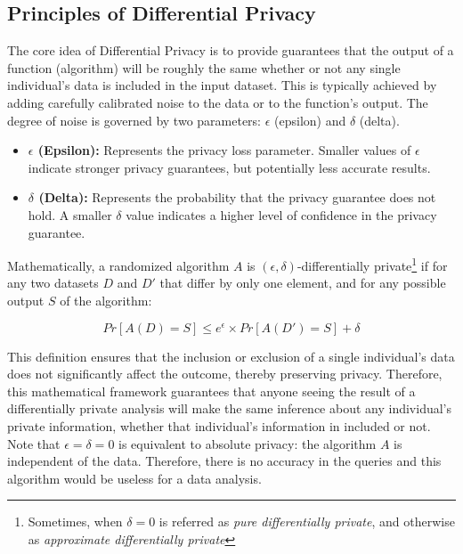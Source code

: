 \subsection{Principles of Differential Privacy}

The core idea of Differential Privacy is to provide guarantees that the output of a function (algorithm) will be roughly the same whether or not any single individual's data is included in the input dataset. This is typically achieved by adding carefully calibrated noise to the data or to the function's output. The degree of noise is governed by two parameters: $\epsilon$ (epsilon) and $\delta$ (delta).

\begin{itemize}
    \item \textbf{$\epsilon$ (Epsilon):} Represents the privacy loss parameter. Smaller values of $\epsilon$ indicate stronger privacy guarantees, but potentially less accurate results.
    \item \textbf{$\delta$ (Delta):} Represents the probability that the privacy guarantee does not hold. A smaller $\delta$ value indicates a higher level of confidence in the privacy guarantee.
\end{itemize}

Mathematically, a randomized algorithm $A$ is $(\epsilon, \delta)$-differentially private\footnote{Sometimes, when $\delta=0$ is referred as \textit{pure differentially private}, and otherwise as \textit{approximate differentially private} } if for any two datasets $D$ and $D'$ that differ by only one element, and for any possible output $S$ of the algorithm:

\[ Pr[A(D) = S] \leq e^\epsilon \times Pr[A(D') = S] + \delta \]

This definition ensures that the inclusion or exclusion of a single individual’s data does not significantly affect the outcome, thereby preserving privacy. Therefore, this mathematical framework guarantees that anyone seeing the result of a differentially private analysis will make the same inference about any individual's private information, whether that individual's information in included or not. \cite{wood2018}
Note that $\epsilon=\delta=0$ is equivalent to absolute privacy: the algorithm $A$ is independent of the data. Therefore, there is no accuracy in the queries and this algorithm would be useless for a data analysis.


